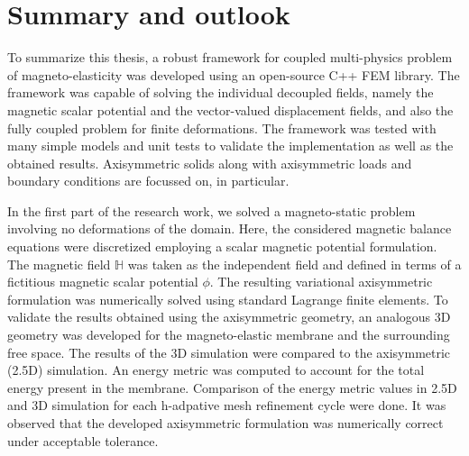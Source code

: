 \chapter{Summary and outlook}
To summarize this thesis, a robust framework for coupled multi-physics problem of magneto-elasticity was developed using an open-source C++ FEM library. The framework was capable of solving the individual decoupled fields, namely the magnetic scalar potential and the vector-valued displacement fields, and also the fully coupled problem for finite deformations. The framework was tested with many simple models and unit tests to validate the implementation as well as the obtained results. Axisymmetric solids along with axisymmetric loads and boundary conditions are focussed on, in particular. \par 
In the first part of the research work, we solved a magneto-static problem involving no deformations of the domain. Here, the considered magnetic balance equations were discretized employing a scalar magnetic potential formulation. The magnetic field $\mathbb{H}$ was taken as the independent field and defined in terms of a fictitious magnetic scalar potential $\phi$. The resulting variational axisymmetric formulation was numerically solved using standard Lagrange finite elements. To validate the results obtained using the axisymmetric geometry, an analogous 3D geometry was developed for the magneto-elastic membrane and the surrounding free space. The results of the 3D simulation were compared to the axisymmetric (2.5D) simulation. An energy metric was computed to account for the total energy present in the membrane. Comparison of the energy metric values in 2.5D and 3D simulation for each h-adpative mesh refinement cycle were done. It was observed that the developed axisymmetric formulation was numerically correct under acceptable tolerance. \par 

